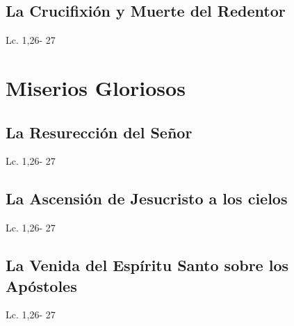 \documentclass[a4paper,11pt,sans]{article}
\begin{document}
    \subsection*{\hfil La Crucifixión y Muerte del Redentor \hfil}
      \begin{multicols}{2}

      \columnbreak
           
      \end{multicols}
      \begin{center}
         Lc. 1,26- 27           
      \end{center}
         
    \newpage
         
  \section*{\hfil Miserios Gloriosos \hfil}
    \subsection*{\hfil La Resurección del Señor \hfil}
      \begin{multicols}{2}

      \columnbreak
                           
      \end{multicols}
      \begin{center}
        Lc. 1,26- 27           
      \end{center}
    \subsection*{\hfil La Ascensión de Jesucristo a los cielos \hfil}
      \begin{multicols}{2}

      \columnbreak
                           
      \end{multicols}         
      \begin{center}
        Lc. 1,26- 27           
      \end{center}
    \subsection*{\hfil La Venida del Espíritu Santo sobre los Apóstoles \hfil}
      \begin{multicols}{2}

      \columnbreak
                           
      \end{multicols}         
      \begin{center}
        Lc. 1,26- 27           
      \end{center}
\end{document}
